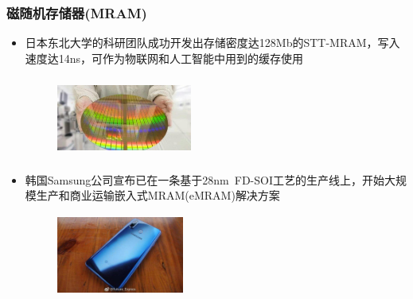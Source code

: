 \documentclass[cjk,slidestop,compress,mathserif,blue]{beamer}
\begin{document}
\frame
{
	\frametitle{磁随机存储器\textrm{(MRAM)}}
	\begin{itemize}
		\item {\tiny \textrm{日本东北大学的科研团队成功开发出存储密度达128\textrm{Mb}的\textrm{STT-MRAM}，写入速度达14\textrm{ns}，可作为物联网和人工智能中用到的缓存使用}}
\begin{figure}[h!]
\vspace*{-0.08in}
\centering
\includegraphics[height=1.05in,width=1.75in]{Figures/Si-crystal-Surface.png}
\label{Fig:Si-crystal-surface}
\end{figure}
\item {\tiny \textrm{韩国\textrm{Samsung}公司宣布已在一条基于28\textrm{nm~FD-SOI}工艺的生产线上，开始大规模生产和商业运输嵌入式\textrm{MRAM(eMRAM)}解决方案}}
\begin{figure}[h!]
\vspace*{-0.08in}
\centering
\includegraphics[height=1.05in,width=1.65in]{Figures/Samsung-cell.png}
\label{Fig:Samsung-cell}
\end{figure}
	\end{itemize}
}
\end{document}
